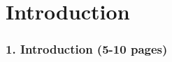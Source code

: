 
\chapter{Introduction} %

\label{Chapter1} %

\newcommand{\keyword}[1]{\textbf{#1}}
\newcommand{\tabhead}[1]{\textbf{#1}}
\newcommand{\code}[1]{\texttt{#1}}
\newcommand{\file}[1]{\texttt{\bfseries#1}}
\newcommand{\option}[1]{\texttt{\itshape#1}}



\subsection*{1. Introduction (5-10 pages)}

    






